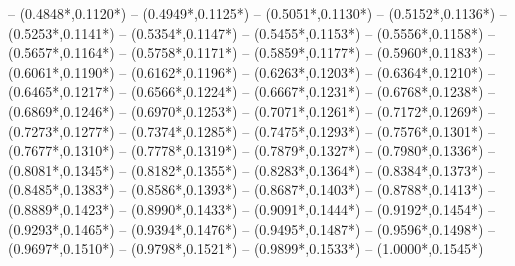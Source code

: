 {	-- ({0.4848*\dx},{0.1120*\dy}) %
	-- ({0.4949*\dx},{0.1125*\dy}) %
	-- ({0.5051*\dx},{0.1130*\dy}) %
	-- ({0.5152*\dx},{0.1136*\dy}) %
	-- ({0.5253*\dx},{0.1141*\dy}) %
	-- ({0.5354*\dx},{0.1147*\dy}) %
	-- ({0.5455*\dx},{0.1153*\dy}) %
	-- ({0.5556*\dx},{0.1158*\dy}) %
	-- ({0.5657*\dx},{0.1164*\dy}) %
	-- ({0.5758*\dx},{0.1171*\dy}) %
	-- ({0.5859*\dx},{0.1177*\dy}) %
	-- ({0.5960*\dx},{0.1183*\dy}) %
	-- ({0.6061*\dx},{0.1190*\dy}) %
	-- ({0.6162*\dx},{0.1196*\dy}) %
	-- ({0.6263*\dx},{0.1203*\dy}) %
	-- ({0.6364*\dx},{0.1210*\dy}) %
	-- ({0.6465*\dx},{0.1217*\dy}) %
	-- ({0.6566*\dx},{0.1224*\dy}) %
	-- ({0.6667*\dx},{0.1231*\dy}) %
	-- ({0.6768*\dx},{0.1238*\dy}) %
	-- ({0.6869*\dx},{0.1246*\dy}) %
	-- ({0.6970*\dx},{0.1253*\dy}) %
	-- ({0.7071*\dx},{0.1261*\dy}) %
	-- ({0.7172*\dx},{0.1269*\dy}) %
	-- ({0.7273*\dx},{0.1277*\dy}) %
	-- ({0.7374*\dx},{0.1285*\dy}) %
	-- ({0.7475*\dx},{0.1293*\dy}) %
	-- ({0.7576*\dx},{0.1301*\dy}) %
	-- ({0.7677*\dx},{0.1310*\dy}) %
	-- ({0.7778*\dx},{0.1319*\dy}) %
	-- ({0.7879*\dx},{0.1327*\dy}) %
	-- ({0.7980*\dx},{0.1336*\dy}) %
	-- ({0.8081*\dx},{0.1345*\dy}) %
	-- ({0.8182*\dx},{0.1355*\dy}) %
	-- ({0.8283*\dx},{0.1364*\dy}) %
	-- ({0.8384*\dx},{0.1373*\dy}) %
	-- ({0.8485*\dx},{0.1383*\dy}) %
	-- ({0.8586*\dx},{0.1393*\dy}) %
	-- ({0.8687*\dx},{0.1403*\dy}) %
	-- ({0.8788*\dx},{0.1413*\dy}) %
	-- ({0.8889*\dx},{0.1423*\dy}) %
	-- ({0.8990*\dx},{0.1433*\dy}) %
	-- ({0.9091*\dx},{0.1444*\dy}) %
	-- ({0.9192*\dx},{0.1454*\dy}) %
	-- ({0.9293*\dx},{0.1465*\dy}) %
	-- ({0.9394*\dx},{0.1476*\dy}) %
	-- ({0.9495*\dx},{0.1487*\dy}) %
	-- ({0.9596*\dx},{0.1498*\dy}) %
	-- ({0.9697*\dx},{0.1510*\dy}) %
	-- ({0.9798*\dx},{0.1521*\dy}) %
	-- ({0.9899*\dx},{0.1533*\dy}) %
	-- ({1.0000*\dx},{0.1545*\dy}) %
}
